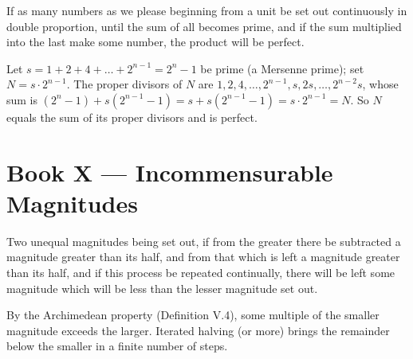 \documentclass{rrxiv}
\begin{document}
\begin{claim}
\label{prop:IX.36}
If as many numbers as we please beginning from a unit be set out
continuously in double proportion, until the sum of all becomes
prime, and if the sum multiplied into the last make some number, the
product will be perfect.
\end{claim}
\begin{evidence}[Proof of IX.36]
\label{ev:IX.36}
Let $s = 1 + 2 + 4 + \dots + 2^{n-1} = 2^n - 1$ be prime (a Mersenne
prime); set $N = s \cdot 2^{n-1}$.  The proper divisors of $N$ are
$1, 2, 4, \dots, 2^{n-1}, s, 2s, \dots, 2^{n-2}s$, whose sum is
$(2^n - 1) + s(2^{n-1} - 1) = s + s(2^{n-1} - 1) = s \cdot 2^{n-1}
= N$.  So $N$ equals the sum of its proper divisors and is perfect.
\end{evidence}
%
%

\section{Book X --- Incommensurable Magnitudes}
\label{sec:book-X}

\begin{claim}
\label{prop:X.1}
Two unequal magnitudes being set out, if from the greater there be
subtracted a magnitude greater than its half, and from that which is
left a magnitude greater than its half, and if this process be
repeated continually, there will be left some magnitude which will be
less than the lesser magnitude set out.
\end{claim}
\begin{evidence}[Proof of X.1]
\label{ev:X.1}
By the Archimedean property (Definition V.4), some multiple of the
smaller magnitude exceeds the larger.  Iterated halving (or more)
brings the remainder below the smaller in a finite number of steps.
\end{evidence}
\end{document}
